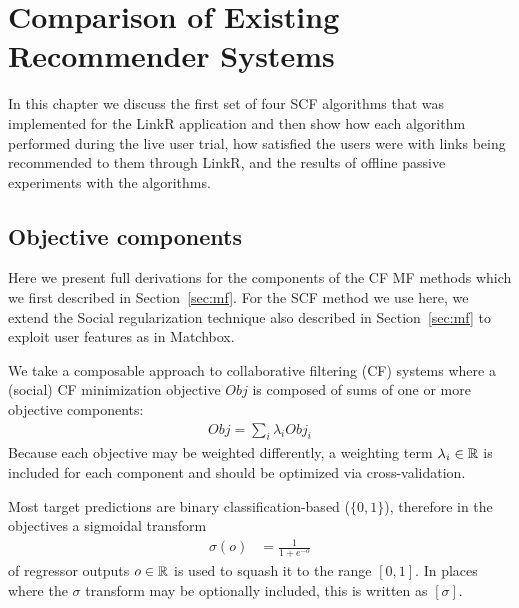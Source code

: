 \chapter{Comparison of Existing Recommender Systems}

In this chapter we discuss the first set of four SCF algorithms that was implemented for the LinkR application and then show how each algorithm performed during the live user trial, how satisfied the users were with links being recommended to them through LinkR, and the results of offline passive experiments with the algorithms.

\section{Objective components}
Here we present full derivations for the components of the CF MF methods which we first described in Section~\ref{sec:mf}. For the SCF method we use here, we extend the Social regularization technique also described in Section~\ref{sec:mf} to exploit user features as in Matchbox.

We take a composable approach to collaborative filtering (CF) systems
where a (social) CF minimization 
objective $\mathit{Obj}$ is composed of sums of one or more
objective components:
\begin{align}
\mathit{Obj} = \sum_i \lambda_i \mathit{Obj}_i
\end{align}
Because each objective may be weighted differently, a 
weighting term $\lambda_i \in \mathbb{R}$ is included for each component and should be
optimized via cross-validation.

Most target predictions are binary 
classification-based ($\{0,1\}$), therefore
in the objectives a sigmoidal transform 
\begin{align}
\sigma(o) & = \frac{1}{1 + e^{-o}}
\end{align}
of regressor outputs $o \in \mathbb{R}$ is used to squash it 
to the range $[0, 1]$.  
In places where the $\sigma$ transform may be optionally included, 
this is written as $[\sigma]$.  

